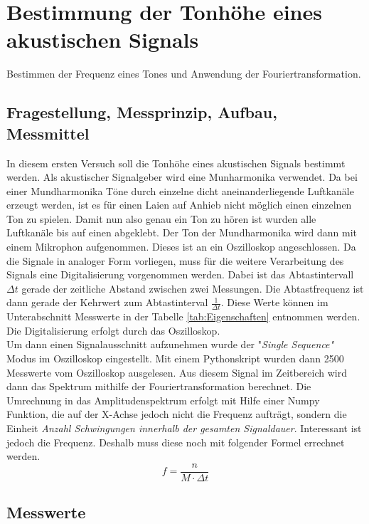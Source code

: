 %
%
\chapter{Bestimmung der Tonhöhe eines akustischen Signals}
\label{chap:VERSUCH_1}
Bestimmen der Frequenz eines Tones und Anwendung der Fouriertransformation.
 
\section{Fragestellung, Messprinzip, Aufbau, Messmittel}
\label{chap:VERSUCH_1_FRAGESTELLUNG}
In diesem ersten Versuch soll die Tonhöhe eines akustischen Signals bestimmt werden. Als akustischer Signalgeber wird eine Munharmonika verwendet. Da bei einer Mundharmonika Töne durch einzelne dicht aneinanderliegende Luftkanäle erzeugt werden, ist es für einen Laien auf Anhieb nicht möglich einen einzelnen Ton zu spielen. Damit nun also genau ein Ton zu hören ist wurden alle Luftkanäle bis auf einen abgeklebt.
Der Ton der Mundharmonika wird dann mit einem Mikrophon aufgenommen. Dieses ist an ein Oszilloskop angeschlossen. 
Da die Signale in analoger Form vorliegen, muss für die weitere Verarbeitung des Signals eine Digitalisierung vorgenommen werden.
Dabei ist das Abtastintervall $\Delta t$ gerade der zeitliche Abstand zwischen zwei Messungen. Die Abtastfrequenz ist dann gerade der Kehrwert zum Abtastinterval $\frac{1}{\Delta t}$. Diese Werte können im Unterabschnitt Messwerte in der Tabelle \ref{tab:Eigenschaften} entnommen werden. Die Digitalisierung erfolgt durch das Oszilloskop.
\\
Um dann einen Signalausschnitt aufzunehmen wurde der "\textit{Single Sequence"} Modus im Oszilloskop eingestellt. Mit einem Pythonskript wurden dann 2500 Messwerte vom Oszilloskop ausgelesen.
Aus diesem Signal im Zeitbereich wird dann das Spektrum mithilfe der Fouriertransformation berechnet. Die Umrechnung in das Amplitudenspektrum
erfolgt mit Hilfe einer Numpy Funktion, die auf der X-Achse jedoch nicht die Frequenz aufträgt, sondern die Einheit \textit{Anzahl Schwingungen innerhalb der gesamten Signaldauer}. Interessant ist jedoch die Frequenz. Deshalb muss diese noch mit folgender Formel errechnet werden.
\begin{equation}
f = \dfrac{n}{M \cdot \Delta t}
\end{equation}




\section{Messwerte}
\label{chap:VERSUCH_1_MESSWERTE}


